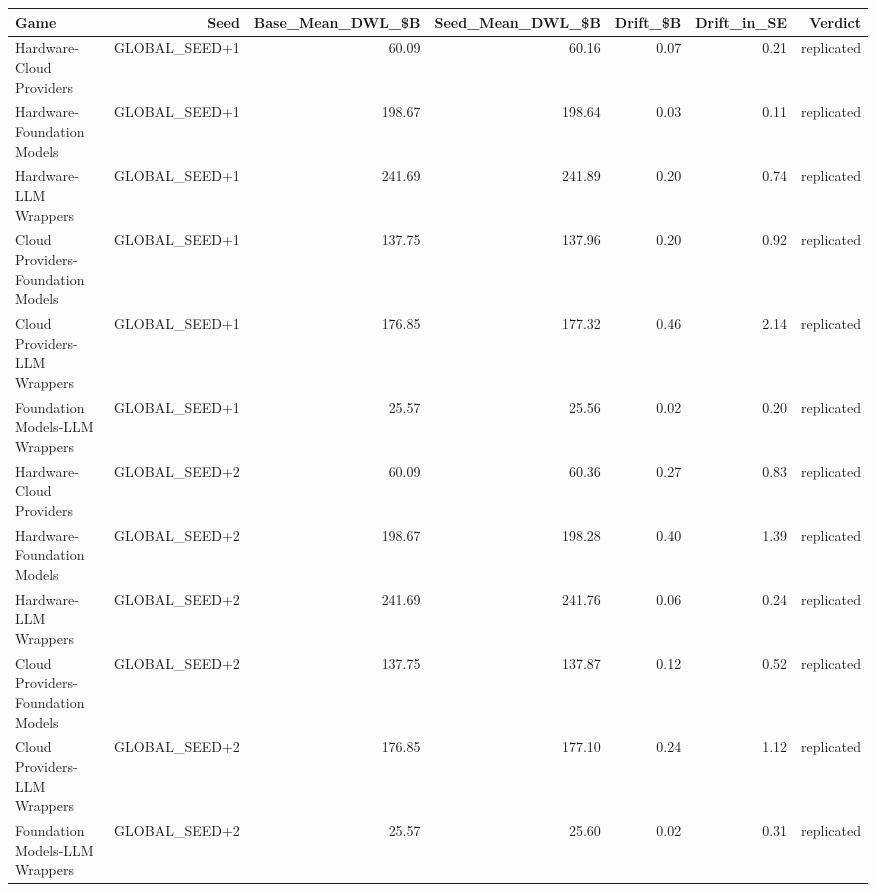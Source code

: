 

\begin{tabular}{@{}lrrrrrr@{}}
\toprule
Game & Seed & Base\_Mean\_DWL\_\$B & Seed\_Mean\_DWL\_\$B & Drift\_\$B & Drift\_in\_SE & Verdict \\
\midrule
Hardware-Cloud Providers & GLOBAL\_SEED+1 & 60.09 & 60.16 & 0.07 & 0.21 & replicated \\
Hardware-Foundation Models & GLOBAL\_SEED+1 & 198.67 & 198.64 & 0.03 & 0.11 & replicated \\
Hardware-LLM Wrappers & GLOBAL\_SEED+1 & 241.69 & 241.89 & 0.20 & 0.74 & replicated \\
Cloud Providers-Foundation Models & GLOBAL\_SEED+1 & 137.75 & 137.96 & 0.20 & 0.92 & replicated \\
Cloud Providers-LLM Wrappers & GLOBAL\_SEED+1 & 176.85 & 177.32 & 0.46 & 2.14 & replicated \\
Foundation Models-LLM Wrappers & GLOBAL\_SEED+1 & 25.57 & 25.56 & 0.02 & 0.20 & replicated \\
Hardware-Cloud Providers & GLOBAL\_SEED+2 & 60.09 & 60.36 & 0.27 & 0.83 & replicated \\
Hardware-Foundation Models & GLOBAL\_SEED+2 & 198.67 & 198.28 & 0.40 & 1.39 & replicated \\
Hardware-LLM Wrappers & GLOBAL\_SEED+2 & 241.69 & 241.76 & 0.06 & 0.24 & replicated \\
Cloud Providers-Foundation Models & GLOBAL\_SEED+2 & 137.75 & 137.87 & 0.12 & 0.52 & replicated \\
Cloud Providers-LLM Wrappers & GLOBAL\_SEED+2 & 176.85 & 177.10 & 0.24 & 1.12 & replicated \\
Foundation Models-LLM Wrappers & GLOBAL\_SEED+2 & 25.57 & 25.60 & 0.02 & 0.31 & replicated \\
\bottomrule
\end{tabular}